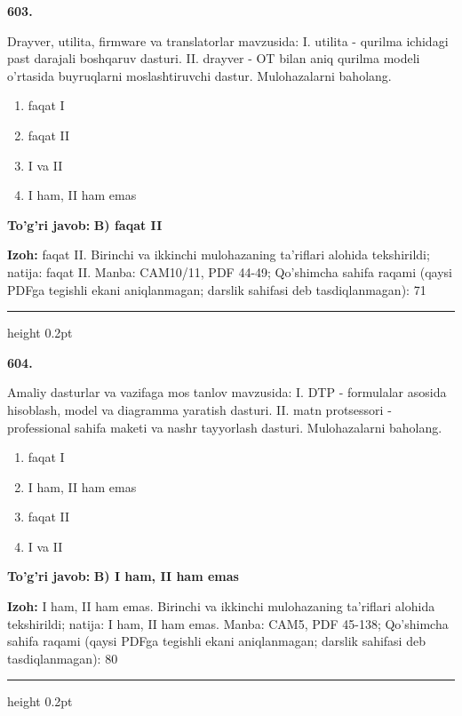 \documentclass[10pt,a4paper]{article}
\begin{document}
{\bfseries\sffamily\color{ink} 603.}
\par
Drayver, utilita, firmware va translatorlar mavzusida: I. utilita - qurilma ichidagi past darajali boshqaruv dasturi. II. drayver - OT bilan aniq qurilma modeli o'rtasida buyruqlarni moslashtiruvchi dastur. Mulohazalarni baholang.
\begin{enumerate}[label=\Alph*),leftmargin=9mm]
\item faqat I
\item faqat II
\item I va II
\item I ham, II ham emas
\end{enumerate}
\begin{tcolorbox}[enhanced,breakable,colback=teal!4,colframe=teal!60!black,boxrule=0.45pt,arc=1.2mm,left=2.7mm,right=2.7mm,top=1.8mm,bottom=1.8mm,before skip=2mm,after skip=2mm]
{\bfseries\sffamily\color{teal}To'g'ri javob:} \textbf{B) faqat II}
\par\smallskip
{\bfseries Izoh:} faqat II. Birinchi va ikkinchi mulohazaning ta'riflari alohida tekshirildi; natija: faqat II. Manba: CAM10/11, PDF 44-49; Qo'shimcha sahifa raqami (qaysi PDFga tegishli ekani aniqlanmagan; darslik sahifasi deb tasdiqlanmagan): 71
\end{tcolorbox}
\vspace{2mm}\hrule height 0.2pt\vspace{3mm}

{\bfseries\sffamily\color{ink} 604.}
\par
Amaliy dasturlar va vazifaga mos tanlov mavzusida: I. DTP - formulalar asosida hisoblash, model va diagramma yaratish dasturi. II. matn protsessori - professional sahifa maketi va nashr tayyorlash dasturi. Mulohazalarni baholang.
\begin{enumerate}[label=\Alph*),leftmargin=9mm]
\item faqat I
\item I ham, II ham emas
\item faqat II
\item I va II
\end{enumerate}
\begin{tcolorbox}[enhanced,breakable,colback=teal!4,colframe=teal!60!black,boxrule=0.45pt,arc=1.2mm,left=2.7mm,right=2.7mm,top=1.8mm,bottom=1.8mm,before skip=2mm,after skip=2mm]
{\bfseries\sffamily\color{teal}To'g'ri javob:} \textbf{B) I ham, II ham emas}
\par\smallskip
{\bfseries Izoh:} I ham, II ham emas. Birinchi va ikkinchi mulohazaning ta'riflari alohida tekshirildi; natija: I ham, II ham emas. Manba: CAM5, PDF 45-138; Qo'shimcha sahifa raqami (qaysi PDFga tegishli ekani aniqlanmagan; darslik sahifasi deb tasdiqlanmagan): 80
\end{tcolorbox}
\vspace{2mm}\hrule height 0.2pt\vspace{3mm}
\end{document}
